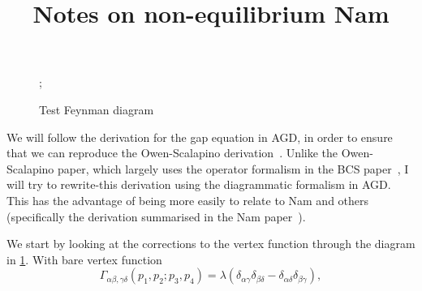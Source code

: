 \documentclass{article}
\title{Notes on non-equilibrium Nam}
\begin{document}
\maketitle

\begin{figure}[htp]
	\centering
	;
	\caption{Test Feynman diagram} \label{fig:diagram}
\end{figure}

We will follow the derivation for the gap equation in AGD\cite{AGD}, in order to ensure that we can reproduce the Owen-Scalapino derivation~\cite{OwenScalapino}.
Unlike the Owen-Scalapino paper, which largely uses the operator formalism in the BCS paper~\cite{BCS}, I will try to rewrite-this derivation using the diagrammatic formalism in AGD.
This has the advantage of being more easily to relate to Nam and others (specifically the derivation summarised in the Nam paper~\cite{Nam1967}).

We start by looking at the corrections to the vertex function through the diagram in \cref{fig:diagram}.
With bare vertex function
\begin{equation}
	\Gamma_{\alpha \beta,\gamma \delta}(p_1, p_2; p_3, p_4) = \lambda \left( \delta_{\alpha\gamma} \delta_{\beta\delta} - \delta_{\alpha\delta}\delta_{\beta\gamma} \right),
\end{equation}
\end{document}
